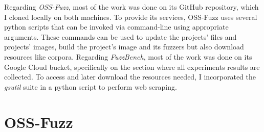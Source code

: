 Regarding \textit{OSS-Fuzz}, most of the work was done on its GitHub repository, which I cloned locally on both machines.
\newline
To provide its services, OSS-Fuzz uses several python scripts that can be invoked via command-line using appropriate arguments. These commands can be used to update the projects' files and projects' images, build the project's image and its fuzzers but also download resources like corpora. 
\newline \newline \newline
Regarding \textit{FuzzBench}, most of the work was done on its Google Cloud bucket, specifically on the section where all experiments results are collected.
\newline
To access and later download the resources needed, I incorporated the \textit{gsutil} suite in a python script to perform web scraping.



\newpage
\section{OSS-Fuzz}

